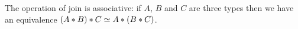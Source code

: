 \documentclass[hott-all.tex]{subfiles}
\begin{document}
% 
% 
\begin{lem}
  The operation of join is associative: if $A$, $B$ and $C$ are three types
  then we have an equivalence $(A*B)*C \simeq A*(B*C)$.
\end{lem}
% 
\end{document}
